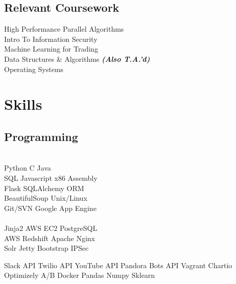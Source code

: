 \documentclass[]{deedy-resume-openfont}
\begin{document}
\begin{minipage}[t]{0.31\textwidth}
\subsection{Relevant Coursework}
High Performance Parallel Algorithms \\
Intro To Information Security \\
Machine Learning for Trading \\
Data Structures \& Algorithms {\footnotesize \textit{\textbf{(Also T.A.'d) }}} \\
Operating Systems
\\[1\baselineskip]


\section{Skills}
\subsection{Programming}
\\[1\baselineskip]

Python \textbullet{}     C     \textbullet{} Java  
\\[1\baselineskip]

SQL \textbullet{} Javascript \textbullet{} x86 Assembly
\\[1\baselineskip]

Flask \textbullet{} SQLAlchemy ORM \\
\textbullet{} BeautifulSoup \textbullet{} Unix/Linux \\ 
Git/SVN \textbullet{} Google App Engine \\
\\[1\baselineskip]
Jinja2  \textbullet{} AWS EC2 \textbullet{} PostgreSQL \\
AWS Redshift \textbullet{} Apache \textbullet{} Nginx\\ 
Solr \textbullet{} Jetty \textbullet{} Bootstrap \textbullet{} IPSec
\sectionsep

  Slack API \textbullet{} Twilio API \textbullet{} YouTube API 
  Pandora Bots API \textbullet{}  Vagrant \textbullet{} Chartio 
  Optimizely A/B \textbullet{} Docker \textbullet{} Pandas 
  Numpy \textbullet{} Sklearn
\sectionsep
\\[1\baselineskip]


\end{minipage}
\end{document}
